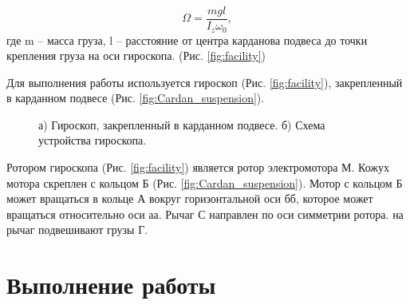 \documentclass[12pt,a4paper]{article}
\begin{document}
\begin{equation}
	\Omega = \frac{mgl}{I_{z}\omega_{0}},
	\label{eq:teor_equation_omega}
\end{equation} 
где m -- масса груза, l -- расстояние от центра карданова подвеса до точки крепления груза на оси гироскопа. (Рис. \ref{fig:facility})

Для выполнения работы используется гироскоп (Рис. \ref{fig:facility}), закрепленный в карданном подвесе (Рис. \ref{fig:Cardan_suspension}).


\begin{figure}[ht!]  
	\vspace{-4ex} 
	\centering 
	\hspace{4ex}
	\caption{а) Гироскоп, закрепленный в карданном подвесе. б) Схема устройства гироскопа.}
\end{figure}

Ротором гироскопа (Рис. \ref{fig:facility}) является ротор электромотора М. Кожух мотора скреплен с кольцом Б (Рис. \ref{fig:Cardan_suspension}). Мотор с кольцом Б может вращаться в кольце А вокруг горизонтальной оси бб, которое может вращаться относительно оси аа. Рычаг С направлен по оси симметрии ротора. на рычаг подвешивают грузы Г.


\section{Выполнение работы}
\end{document}
